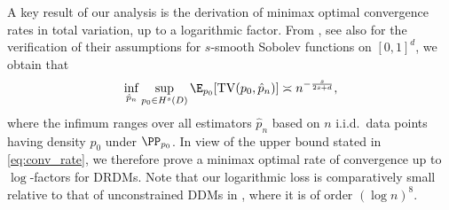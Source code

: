 \documentclass[a4paper, 11pt, headings = small, abstract]{scrartcl}
\begin{document}
A key result of our analysis is the derivation of minimax optimal convergence rates in total variation, up to a logarithmic factor. From \cite[Theorem 4]{yang99}, see also \cite[Proposition 5.2]{oko23} for the verification of their assumptions for $s$-smooth Sobolev functions on $[0,1]^d$, we obtain that 
\[\inf_{\hat{p}_n} \sup_{p_0 \in H^s(D)} \E_{p_0}[\mathrm{TV}(p_0,\hat{p}_n)] \asymp n^{-\frac{s}{2s+d}},\] 
where the infimum ranges over all estimators $\hat{p}_n$ based on $n$ i.i.d.\ data points having density $p_0$ under $\PP_{p_0}$. In view of the upper bound stated in \eqref{eq:conv_rate}, we therefore prove a minimax optimal rate of convergence up to $\log$-factors for DRDMs. Note that our logarithmic loss is comparatively small relative to that of unconstrained DDMs in \cite{oko23}, where it is of order $(\log n)^8$.
\end{document}
